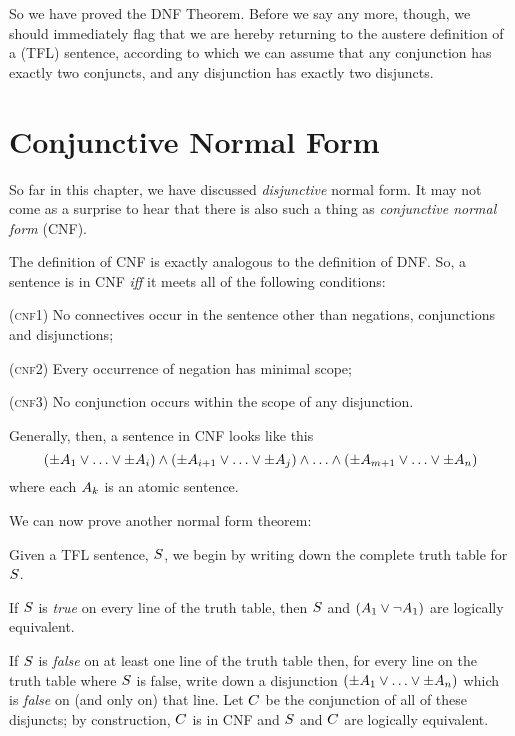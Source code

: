 So we have proved the DNF Theorem. Before we say any more, though, we should immediately flag that we are hereby returning to the austere definition of a (TFL) sentence, according to which we can assume that any conjunction has exactly two conjuncts, and any disjunction has exactly two disjuncts.


\section{Conjunctive Normal Form}
\label{s:CNF}

So far in this chapter, we have discussed \emph{disjunctive} normal form. It may not come as a surprise to hear that there is also such a thing as \emph{conjunctive normal form} (CNF).

The definition of CNF is exactly analogous to the definition of DNF. So, a sentence is in CNF \emph{iff} it meets all of the following conditions:
	\begin{earg}
		\item[(\textsc{cnf1})] No connectives occur in the sentence other than negations, conjunctions and disjunctions;
		\item[(\textsc{cnf2})] Every occurrence of negation has minimal scope;
		\item[(\textsc{cnf3})] No conjunction occurs within the scope of any disjunction.
	\end{earg}
Generally, then, a sentence in CNF looks like this
	$$(\pm A_1 \lor \ldots \lor \pm A_i) \land (\pm A_{i+1} \lor \ldots \lor \pm A_j) \land \ldots \land (\pm A_{m+1} \lor\ldots \lor \pm A_n)$$
where each $A_k$ is an atomic sentence.

We can now prove another normal form theorem:


	Given a TFL sentence, $S$, we begin by writing down the complete truth table for $S$.

	If $S$ is \emph{true} on every line of the truth table, then $S$ and $(A_1 \vee \neg A_1)$ are logically equivalent.

	If $S$ is \emph{false} on at least one line of the truth table then, for every line on the truth table where $S$ is false, write down a disjunction $(\pm A_1 \vee \ldots \vee \pm A_n)$ which is \emph{false} on (and only on) that line. Let $C$ be the conjunction of all of these disjuncts; by construction, $C$ is in CNF and $S$ and $C$ are logically equivalent.

